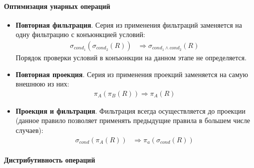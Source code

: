 \paragraph{Оптимизация унарных операций}

\begin{itemize}
	\item \textbf{Повторная фильтрация}. Серия из применения фильтраций заменяется на одну
	      фильтрацию с конъюнкцией условий:
	      \begin{align}
		      \sigma_{cond_1}(\sigma_{cond_2}(R)) & \Rightarrow \sigma_{cond_1 \wedge cond_2}(R)
	      \end{align}
	      Порядок проверки условий в конъюнкции на данном этапе не определяется.
	\item \textbf{Повторная проекция}. Серия из применения проекций заменяется на самую внешнюю из
	      них:
	      \begin{align}
		      \pi_A(\pi_B(R)) \Rightarrow \pi_A(R)
	      \end{align}
	\item \textbf{Проекция и фильтрация}. Фильтрация всегда осуществляется до проекции (данное
	      правило позволяет применять предыдущие правила в большем числе случаев):
	      \begin{align}
		      \sigma_{cond}(\pi_A(R)) & \Rightarrow \pi_a(\sigma_{cond}(R))
	      \end{align}
\end{itemize}

\paragraph{Дистрибутивность операций}

